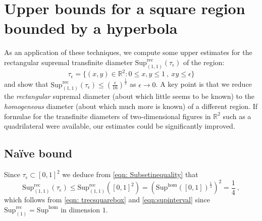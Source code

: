 \documentclass[a4paper,10pt]{amsart}
\theoremstyle{definition}
\theoremstyle{remark}
\numberwithin{equation}{section}
\newcommand{\R}{\mathbb R}
\newcommand{\rec}{\mathrm{rec}}
\newcommand{\ts}{\mathrm{Sup}}
\newcommand{\0}{\color{blue}{\mathsf{0}}}
\begin{document}
   
     
     
       
       
  \section{Upper bounds for a square region bounded by a hyperbola} \label{sect: hyperbolaregion}
  As an application of these techniques, we compute some  upper estimates for the  rectangular supremal transfinite diameter $\ts^{\rec}_{(1,1)}(\tau_{\epsilon})$ of the region:
  \[ \tau_{\epsilon} = \{ (x,y) \in \R^2:    0\leq x, y\leq 1 \ , \   xy \leq \epsilon\}
  \]
 and show that $\ts^{\rec}_{(1,1)}(\tau_{\epsilon}) \leq \left( \frac{\epsilon}{16}\right)^{\frac{1}{3}}$ as $\epsilon \rightarrow 0$.
  A key point is that we reduce the \emph{rectangular} supremal diameter (about which little seems to be known) to the \emph{homogeneous}  diameter (about which much more is known)  of a different region.  
   If  formulae for the transfinite diameters of two-dimensional figures in $\R^2$ such as a quadrilateral were available, our estimates could be significantly improved. %
  
  \subsection{Na\"ive bound} Since $\tau_{\epsilon} \subset [0,1]^2$ we deduce from \eqref{eqn: Subsetinequality}   that
  \[  \ts_{(1,1)}^{ \rec}(\tau_\epsilon) \leq   \ts_{(1,1)}^{\rec} ([0,1]^2) =   (\ts^{\hom} ([0,1])^{\frac{1}{2}})^2= \frac{1}{4}\ ,  \]
which follows from   \eqref{eqn: trecsquarebox} and    \eqref{eqn:supinterval} since $\ts_{(1)}^{\rec}= \ts^{\hom}$ in dimension $1$.
\end{document}
